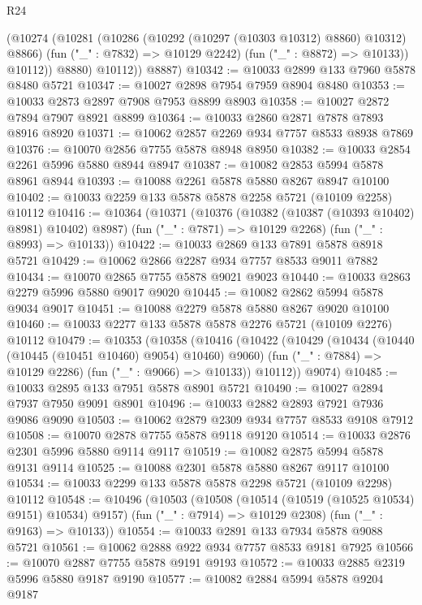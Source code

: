 \begin{lexlean}{R24}
\begin{coremodule}
              (@10274
                (@10281
                  (@10286 (@10292 (@10297 (@10303 @10312) @8860) @10312) @8866)
                  (fun ("_" : @7832) => @10129 @2242)
                  (fun ("_" : @8872) => @10133))
                @10112))
            @8880)
          @10112))
      @8887)
@10342 := @10033 @2899 @133 @7960 @5878 @8480 @5721
@10347 := @10027 @2898 @7954 @7959 @8904 @8480
@10353 := @10033 @2873 @2897 @7908 @7953 @8899 @8903
@10358 := @10027 @2872 @7894 @7907 @8921 @8899
@10364 := @10033 @2860 @2871 @7878 @7893 @8916 @8920
@10371 := @10062 @2857 @2269 @934 @7757 @8533 @8938 @7869
@10376 := @10070 @2856 @7755 @5878 @8948 @8950
@10382 := @10033 @2854 @2261 @5996 @5880 @8944 @8947
@10387 := @10082 @2853 @5994 @5878 @8961 @8944
@10393 := @10088 @2261 @5878 @5880 @8267 @8947 @10100
@10402 := @10033 @2259 @133 @5878 @5878 @2258 @5721 (@10109 @2258) @10112
@10416 := @10364
    (@10371
      (@10376 (@10382 (@10387 (@10393 @10402) @8981) @10402) @8987)
      (fun ("_" : @7871) => @10129 @2268)
      (fun ("_" : @8993) => @10133))
@10422 := @10033 @2869 @133 @7891 @5878 @8918 @5721
@10429 := @10062 @2866 @2287 @934 @7757 @8533 @9011 @7882
@10434 := @10070 @2865 @7755 @5878 @9021 @9023
@10440 := @10033 @2863 @2279 @5996 @5880 @9017 @9020
@10445 := @10082 @2862 @5994 @5878 @9034 @9017
@10451 := @10088 @2279 @5878 @5880 @8267 @9020 @10100
@10460 := @10033 @2277 @133 @5878 @5878 @2276 @5721 (@10109 @2276) @10112
@10479 := @10353
    (@10358
      (@10416
        (@10422
          (@10429
            (@10434 (@10440 (@10445 (@10451 @10460) @9054) @10460) @9060)
            (fun ("_" : @7884) => @10129 @2286)
            (fun ("_" : @9066) => @10133))
          @10112))
      @9074)
@10485 := @10033 @2895 @133 @7951 @5878 @8901 @5721
@10490 := @10027 @2894 @7937 @7950 @9091 @8901
@10496 := @10033 @2882 @2893 @7921 @7936 @9086 @9090
@10503 := @10062 @2879 @2309 @934 @7757 @8533 @9108 @7912
@10508 := @10070 @2878 @7755 @5878 @9118 @9120
@10514 := @10033 @2876 @2301 @5996 @5880 @9114 @9117
@10519 := @10082 @2875 @5994 @5878 @9131 @9114
@10525 := @10088 @2301 @5878 @5880 @8267 @9117 @10100
@10534 := @10033 @2299 @133 @5878 @5878 @2298 @5721 (@10109 @2298) @10112
@10548 := @10496
    (@10503
      (@10508 (@10514 (@10519 (@10525 @10534) @9151) @10534) @9157)
      (fun ("_" : @7914) => @10129 @2308)
      (fun ("_" : @9163) => @10133))
@10554 := @10033 @2891 @133 @7934 @5878 @9088 @5721
@10561 := @10062 @2888 @922 @934 @7757 @8533 @9181 @7925
@10566 := @10070 @2887 @7755 @5878 @9191 @9193
@10572 := @10033 @2885 @2319 @5996 @5880 @9187 @9190
@10577 := @10082 @2884 @5994 @5878 @9204 @9187

\end{coremodule}
\end{lexlean}
